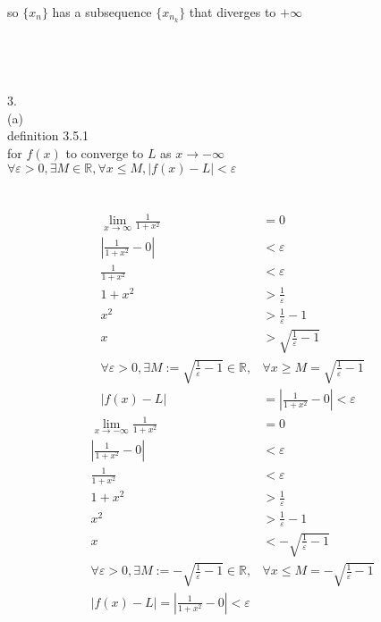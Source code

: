 \documentclass[12pt, border = 4pt, multi]{article} %
\begin{document}
so $\{x_n\}$ has a subsequence $\{x_{n_k}\}$ that diverges to $+\infty$\\
\\
\\
\\
\\
3.\\
(a)\\
definition 3.5.1\\
for $f(x)$ to converge to $L$ as $x \rightarrow -\infty$\\
$\forall \varepsilon > 0, \exists M \in \mathbb{R}, \forall x \leq M, |f(x) - L| < \varepsilon$\\
\\
\\
\begin{align*}
\lim_{x \rightarrow \infty} \frac{1}{1 + x ^ 2} &= 0\\
\left|\frac{1}{1 + x ^ 2} - 0\right| &< \varepsilon\\
\frac{1}{1 + x ^ 2} &< \varepsilon\\
1 + x ^ 2 &> \frac{1}{\varepsilon}\\
x ^ 2 &> \frac{1}{\varepsilon} - 1\\
x &> \sqrt{\frac{1}{\varepsilon} - 1}\\
\forall \varepsilon > 0, \exists M := \sqrt{\frac{1}{\varepsilon} - 1} \in \mathbb{R}, &\forall x \geq M = \sqrt{\frac{1}{\varepsilon} - 1}\\
|f(x) - L| &= \left|\frac{1}{1 + x ^ 2} - 0\right| < \varepsilon
\end{align*}
\begin{align*}
\lim_{x \rightarrow -\infty} \frac{1}{1 + x ^ 2} &= 0\\
\left|\frac{1}{1 + x ^ 2} - 0\right| &< \varepsilon\\
\frac{1}{1 + x ^ 2} &< \varepsilon\\
1 + x ^ 2 &> \frac{1}{\varepsilon}\\
x ^ 2 &> \frac{1}{\varepsilon} - 1\\
x &< -\sqrt{\frac{1}{\varepsilon} - 1}\\
\forall \varepsilon > 0, \exists M := -\sqrt{\frac{1}{\varepsilon} - 1} \in \mathbb{R}, &\forall x \leq M = -\sqrt{\frac{1}{\varepsilon} - 1}\\
|f(x) - L| = \left|\frac{1}{1 + x ^ 2} - 0\right| < \varepsilon\\
\end{align*}
\\
\\
\end{document}
